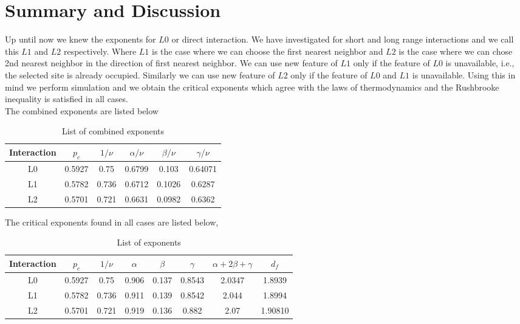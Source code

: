 
\chapter{Summary and Discussion}

Up until now we knew the exponents for $L0$ or direct interaction. We have investigated for short and long range interactions and we call this $L1$ and $L2$ respectively. Where $L1$ is the case where we can choose the first nearest neighbor and $L2$ is the case where we can chose 2nd nearest neighbor in the direction of first nearest neighbor. We can use new feature of $L1$ only if the feature of $L0$ is unavailable, i.e., the selected site is already occupied. Similarly we can use new feature of $L2$ only if the feature of $L0$ and $L1$ is unavailable. Using this in mind we perform simulation and we obtain the critical exponents which agree with the laws of thermodynamics and the Rushbrooke inequality is satisfied in all cases.\\
The combined exponents are listed below\\
\begin{table}
\centering
\begin{tabular}{|c|c|c|c|c|c|}
	\hline
	Interaction & $p_c$ & $1/\nu$ & $\alpha/\nu$ & $\beta/\nu$ & $\gamma/\nu$ \\ \hline
	L0 & 0.5927 & 0.75  & 0.6799 & 0.103  & 0.64071  \\ \hline
	L1 & 0.5782 & 0.736 & 0.6712 & 0.1026 & 0.6287  \\ \hline
	L2 & 0.5701 & 0.721 & 0.6631 & 0.0982 & 0.6362  \\ \hline
\end{tabular}
\caption{List of combined exponents}
\label{tab:exponents-combined}
\end{table}
The critical exponents found in all cases are listed below,\\
\begin{table}
\centering
\begin{tabular}{|c|c|c|c|c|c|c|c|}
	\hline
	Interaction & $p_c$ & $1/\nu$ & $\alpha$ & $\beta$ & $\gamma$ & $\alpha+2\beta+\gamma$ & $d_f$\\ \hline
	L0 & 0.5927 & 0.75  & 0.906 & 0.137 & 0.8543 & 2.0347 & 1.8939  \\ \hline
	L1 & 0.5782 & 0.736 & 0.911 & 0.139 & 0.8542 & 2.044  & 1.8994  \\ \hline
	L2 & 0.5701 & 0.721 & 0.919 & 0.136 & 0.882  & 2.07   & 1.90810 \\ \hline

\end{tabular}
\caption{List of exponents}
\label{tab:exponents}
\end{table}

